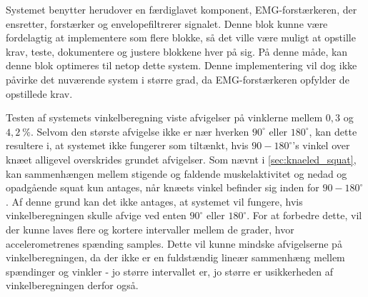 
Systemet benytter herudover en færdiglavet komponent, EMG-forstærkeren, der ensretter, forstærker og envelopefiltrerer signalet. Denne blok kunne være fordelagtig at implementere som flere blokke, så det ville være muligt at opstille krav, teste, dokumentere og justere blokkene hver på sig. På denne måde, kan denne blok optimeres til netop dette system. Denne implementering vil dog ikke påvirke det nuværende system i større grad, da EMG-forstærkeren opfylder de opstillede krav. %

Testen af systemets vinkelberegning viste afvigelser på vinklerne mellem $0,3$ og $4,2~\%$. Selvom den største afvigelse ikke er nær hverken $90^{\circ}$ eller $180^{\circ}$, kan dette resultere i, at systemet ikke fungerer som tiltænkt, hvis $90-180^{\circ}$'s vinkel over knæet alligevel overskrides grundet afvigelser. Som nævnt i \autoref{sec:knaeled_squat}, kan sammenhængen mellem stigende og faldende muskelaktivitet og nedad og opadgående squat kun antages, når knæets vinkel befinder sig inden for $90-180^{\circ}$. Af denne grund kan det ikke antages, at systemet vil fungere, hvis vinkelberegningen skulle afvige ved enten $90^{\circ}$ eller $180^{\circ}$. For at forbedre dette, vil der kunne laves flere og kortere intervaller mellem de grader, hvor accelerometrenes spænding samples. Dette vil kunne mindske afvigelserne på vinkelberegningen, da der ikke er en fuldstændig lineær sammenhæng mellem spændinger og vinkler - jo større intervallet er, jo større er usikkerheden af vinkelberegningen derfor også.

